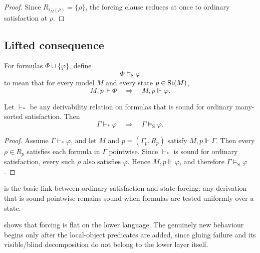 \begin{proof}
Since $R_{i_M(\rho)}=\{\rho\}$, the forcing clause reduces at once to ordinary satisfaction at $\rho$.
\end{proof}

\subsection{Lifted consequence}

\begin{definition}\label{def:state-semantic-consequence}
For formulas $\Phi\cup\{\varphi\}$, define
\[
\Phi\models_{\mathrm{S}}\varphi
\]
to mean that for every model $M$ and every state $p\in\mathrm{St}(M)$,
\[
M,p\Vdash\Phi
\quad\Longrightarrow\quad
M,p\Vdash\varphi.
\]
\end{definition}

\begin{proposition}\label{prop:lifted-pointwise-soundness}
Let $\vdash_*$ be any derivability relation on formulas that is sound for ordinary many-sorted satisfaction. Then
\[
\Gamma\vdash_*\varphi
\quad\Longrightarrow\quad
\Gamma\models_{\mathrm{S}}\varphi.
\]
\end{proposition}

\begin{proof}
Assume $\Gamma\vdash_*\varphi$, and let $M$ and $p=(\Gamma_p,R_p)$ satisfy $M,p\Vdash\Gamma$. Then every $\rho\in R_p$ satisfies each formula in $\Gamma$ pointwise. Since $\vdash_*$ is sound for ordinary satisfaction, every such $\rho$ also satisfies $\varphi$. Hence $M,p\Vdash\varphi$, and therefore $\Gamma\models_{\mathrm{S}}\varphi$.
\end{proof}

 is the basic link between ordinary satisfaction and state forcing: any derivation that is sound pointwise remains sound when formulas are tested uniformly over a state.

\begin{remark}
 shows that forcing is flat on the lower language. The genuinely new behaviour begins only after the local-object predicates are added, since gluing failure and its visible/blind decomposition do not belong to the lower layer itself.
\end{remark}

